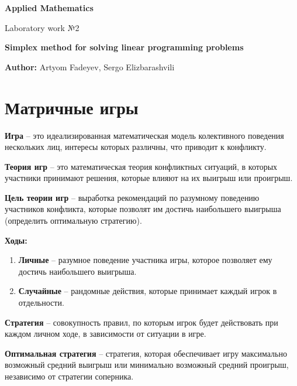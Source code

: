 \documentclass[9pt, a4paper]{article}
\begin{document}
    \begin{titlepage}
        \begin{center}
            \vspace*{2cm}
            \Large
            \textbf{Applied Mathematics}

            \vspace{1cm}
            \large
            Laboratory work №2

            \vspace{1cm}
            \textbf{Simplex method for solving linear programming problems}

            \vspace{1cm}
            \textbf{Author:} Artyom Fadeyev, Sergo Elizbarashvili
        \end{center}
    \end{titlepage}
    \newpage


    \section{Матричные игры}\label{sec:matrix_games}

    \textbf{Игра} -- это идеализированная математическая модель колективного поведения
    нескольких лиц, интересы которых различны, что приводит к конфликту.

    \textbf{Теория игр} -- это математическая теория конфликтных ситуаций, в которых
    участники принимают решения, которые влияют на их выигрыш или проигрыш.

    \textbf{Цель теории игр} -- выработка рекомендаций по разумному поведению участников
    конфликта, которые позволят им достичь наибольшего выигрыша (определить оптимальную стратегию).

    \textbf{Ходы:}
    \begin{enumerate}
        \item \textbf{Личные} -- разумное поведение участника игры, которое позволяет ему достичь наибольшего выигрыша.
        \item \textbf{Случайные} -- рандомные действия, которые принимает каждый игрок в отдельности.
    \end{enumerate}

    \textbf{Стратегия} -- совокупность правил, по которым игрок будет действовать при каждом личном ходе,
    в зависимости от ситуации в игре.

    \textbf{Оптимальная стратегия} -- стратегия, которая обеспечивает игру максимально возможный средний выигрыш или
    минимально возможный средний проигрыш, независимо от стратегии соперника.
\end{document}
